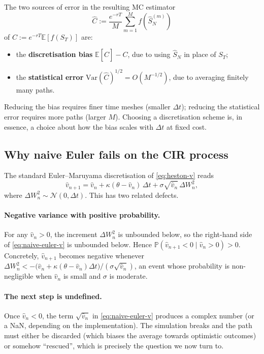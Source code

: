 \documentclass[11pt]{article}
\theoremstyle{plain}
\theoremstyle{definition}
\theoremstyle{remark}
\begin{document}
The two sources of error in the resulting MC estimator
\[
    \widehat C := \frac{e^{-rT}}{M} \sum_{m=1}^M f(\hat S^{(m)}_N)
\]
of $C := e^{-rT}\mathbb{E}[f(S_T)]$ are:
\begin{itemize}[topsep=2pt]
    \item the \textbf{discretisation bias} $\mathbb{E}[\widehat C] - C$, due to using $\hat S_N$ in place of $S_T$;
    \item the \textbf{statistical error} $\mathrm{Var}(\widehat C)^{1/2} = O(M^{-1/2})$, due to averaging finitely many paths.
\end{itemize}
Reducing the bias requires finer time meshes (smaller $\Delta t$); reducing the statistical error requires more paths (larger $M$). Choosing a discretisation scheme is, in essence, a choice about how the bias scales with $\Delta t$ at fixed cost.

\subsection{Why naive Euler fails on the CIR process}

The standard Euler--Maruyama discretisation of \eqref{eq:heston-v} reads
\begin{equation}
    \hat v_{n+1} = \hat v_n + \kappa(\theta - \hat v_n)\,\Delta t + \sigma\sqrt{\hat v_n}\,\Delta W^2_n,                                                  \label{eq:naive-euler-v}
\end{equation}
where $\Delta W^2_n \sim \mathcal{N}(0, \Delta t)$. This has two related defects.

\paragraph{Negative variance with positive probability.} For any $\hat v_n > 0$, the increment $\Delta W^2_n$ is unbounded below, so the right-hand side of \eqref{eq:naive-euler-v} is unbounded below. Hence $\mathbb{P}(\hat v_{n+1} < 0 \mid \hat v_n > 0) > 0$. Concretely, $\hat v_{n+1}$ becomes negative whenever $\Delta W^2_n < -\bigl(\hat v_n + \kappa(\theta - \hat v_n)\Delta t\bigr)/(\sigma\sqrt{\hat v_n})$, an event whose probability is non-negligible when $\hat v_n$ is small and $\sigma$ is moderate.

\paragraph{The next step is undefined.} Once $\hat v_n < 0$, the term $\sqrt{\hat v_n}$ in \eqref{eq:naive-euler-v} produces a complex number (or a NaN, depending on the implementation). The simulation breaks and the path must either be discarded (which biases the average towards optimistic outcomes) or somehow ``rescued'', which is precisely the question we now turn to.
\end{document}

